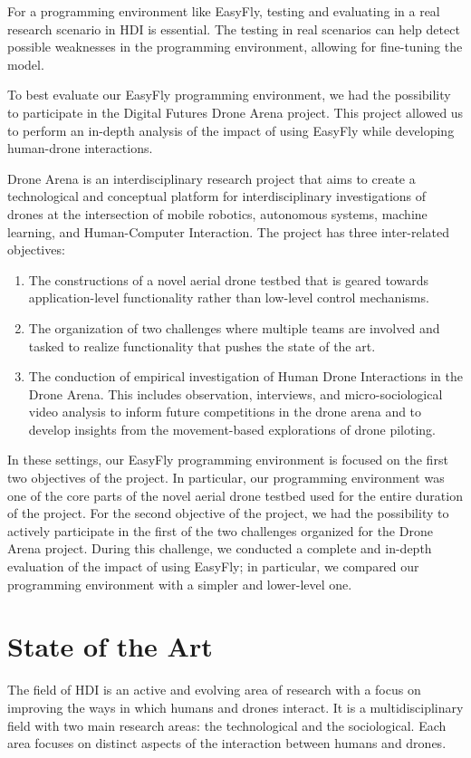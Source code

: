 For a programming environment like EasyFly, testing and evaluating in a real research scenario in HDI is essential. 
The testing in real scenarios can help detect possible weaknesses in the programming environment, allowing for fine-tuning the model.

To best evaluate our EasyFly programming environment, we had the possibility to participate in the Digital Futures Drone Arena project.
This project allowed us to perform an in-depth analysis of the impact of using EasyFly while developing human-drone interactions.

Drone Arena is an interdisciplinary research project that aims to create a technological and conceptual platform for interdisciplinary investigations of drones at the intersection of mobile robotics,
 autonomous systems, machine learning, and Human-Computer Interaction.
The project has three inter-related objectives:
\begin{enumerate}
    \item   The constructions of a novel aerial drone testbed that is geared towards application-level
            functionality rather than low-level control mechanisms.
    \item   The organization of two challenges where multiple teams are involved and tasked to realize
            functionality that pushes the state of the art.
    \item   The conduction of empirical investigation of Human Drone Interactions in the Drone Arena.
            This includes observation, interviews, and micro-sociological video analysis to inform future
            competitions in the drone arena and to develop insights from the movement-based explorations of drone piloting.
\end{enumerate}

In these settings, our EasyFly programming environment is focused on the first two objectives of the project.
In particular, our programming environment was one of the core parts of the novel aerial drone testbed used for the entire duration of the project. 
For the second objective of the project, we had the possibility to actively participate in the first of the two challenges organized for the Drone Arena project. 
During this challenge, we conducted a complete and in-depth evaluation of the impact of using EasyFly; 
in particular, we compared our programming environment with a simpler and lower-level one.


\section{State of the Art}\label{sec:intro_soa}
The field of HDI is an active and evolving area of research with a focus on improving the ways in which humans
and drones interact. It is a multidisciplinary field with two main research areas: the technological and the sociological.
Each area focuses on distinct aspects of the interaction between humans and drones.

